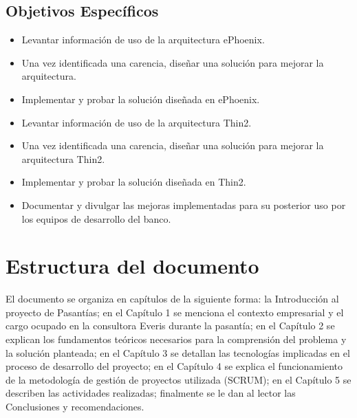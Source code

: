 \subsection*{Objetivos Específicos}
\begin{itemize}
  \item Levantar información de uso de la arquitectura ePhoenix.
  \item Una vez identificada una carencia, diseñar una solución para
        mejorar la arquitectura.
  \item Implementar y probar la solución diseñada en ePhoenix.
  \item Levantar información de uso de la arquitectura Thin2.
  \item Una vez identificada una carencia, diseñar una solución para
        mejorar la arquitectura Thin2.
  \item Implementar y probar la solución diseñada en Thin2.
  \item Documentar y divulgar las mejoras implementadas para su
        posterior uso por los equipos de desarrollo del banco.
\end{itemize}

\section*{Estructura del documento}

El documento se organiza en capítulos de la siguiente forma: la
Introducción al proyecto de Pasantías; en el Capítulo 1 se menciona
el contexto empresarial y el cargo ocupado en la
consultora Everis durante la pasantía; en el Capítulo 2 se explican
los fundamentos teóricos necesarios para la comprensión del problema y
la solución planteada; en el Capítulo 3 se detallan las tecnologías
implicadas en el proceso de desarrollo del proyecto; en el Capítulo 4 se
explica el funcionamiento de la metodología de gestión de proyectos utilizada
(SCRUM); en el Capítulo 5 se describen las actividades realizadas;
finalmente se le dan al lector las Conclusiones y recomendaciones.
